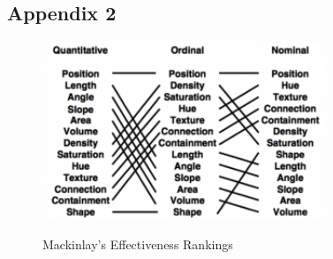 \documentclass{article}
\begin{document}
\subsection{Appendix 2}
\begin{figure}[H]
  \begin{minipage}[b]{1.0\linewidth}
    \centering
    \centerline{\includegraphics[width=8.5cm]{mackinlayRankings}}
    \centerline{Mackinlay's Effectiveness Rankings}\medskip
  \end{minipage}
\end{figure}
\end{document}
